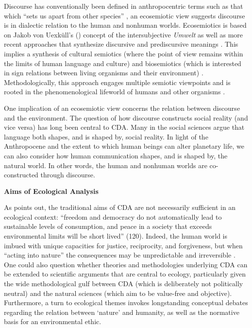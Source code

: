 Discourse has conventionally been defined in anthropocentric terms such as that which ``sets us apart from other species'' \citep[4]{Blommaert2005a}, an ecosemiotic view suggests discourse is in dialectic relation to the human and nonhuman worlds. Ecosemiotics is based on Jakob von Uexk\"ull's (\citeyear{VonUexkull1982}) concept of the intersubjective \textit{Umwelt} as well as more recent approaches that synthesize discursive and prediscursive meanings \citep{Kull1999a, Sebeok2001a, Maran2007a}. This implies a synthesis of cultural semiotics (where the point of view remains within the limits of human language and culture) and biosemiotics (which is interested in sign relations between living organisms and their environment) \citep[279]{Maran2007a}. Methodologically, this approach engages multiple semiotic viewpoints and is rooted in the phenomenological lifeworld of humans and other organisms \citep{Buchanan2008a}.

One implication of an ecosemiotic view concerns the relation between discourse and the environment. The question of how discourse constructs social reality (and vice versa) has long been central to CDA. Many in the social sciences argue that language both shapes, and is shaped by, social reality. In light of the Anthropocene and the extent to which human beings can alter planetary life, we can also consider how human communication shapes, and is shaped by, the natural world. In other words, the human and nonhuman worlds are co-constructed through discourse.

\textbf{Aims of Ecological Analysis}

As \cite*{Stibbe2014b} points out, the traditional aims of CDA are not necessarily sufficient in an ecological context: ``freedom and democracy do not automatically lead to sustainable levels of consumption, and peace in a society that exceeds environmental limits will be short lived'' (120). Indeed, the human world is imbued with unique capacities for justice, reciprocity, and forgiveness, but when ``acting into nature'' the consequences may be unpredictable and irreversible \citep[59]{Arendt1958a}. One could also question whether theories and methodologies underlying CDA can be extended to scientific arguments that are central to ecology, particularly given the wide methodological gulf between CDA (which is deliberately not politically neutral) and the natural sciences (which aim to be value-free and objective). Furthermore, a turn to ecological themes invokes longstanding conceptual debates regarding the relation between `nature' and humanity, as well as the normative basis for an environmental ethic.

